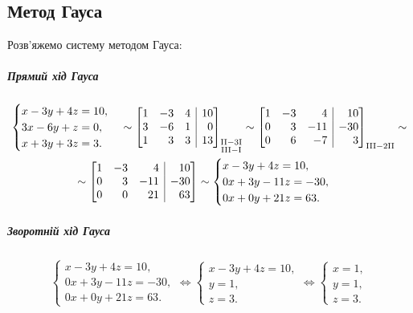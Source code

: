 \subsection{Метод Гауса}
\solving
Розв'яжемо систему методом Гауса:
\subparagraph{Прямий хід Гауса}
\begin{gather}
	\begin{cases}
		x-3y+4z=10,\\
		3x-6y+z=0,\\
		x+3y+3z=3.
	\end{cases}\sim\left[\begin{array}{@{}rrr|r@{}}
	1&-3&4&10\\
	3&-6&1&0\\
	1&3&3&13
\end{array}\right]_{\substack{\mathrm{II-3I}\hfill\\\mathrm{III-I}}}\sim\left[\begin{array}{@{}rrr|r@{}}
1&-3&4&10\\
0&3&-11&-30\\
0&6&-7&3
\end{array}\right]_{\substack{\mathrm{III-2II}}}\sim\\
\sim\left[\begin{array}{@{}rrr|r@{}}
	1&-3&4&10\\
	0&3&-11&-30\\
	0&0&21&63
\end{array}\right]\sim\begin{cases}
x-3y+4z=10,\\
0x+3y-11z=-30,\\
0x+0y+21z=63.
\end{cases}
\end{gather}
\subparagraph{Зворотній хід Гауса}
\begin{gather}
	\begin{cases}
		x-3y+4z=10,\\
		0x+3y-11z=-30,\\
		0x+0y+21z=63.
	\end{cases}\Leftrightarrow\begin{cases}
	x-3y+4z=10,\\
	y=1,\\
	z=3.
\end{cases}\Leftrightarrow\begin{cases}
x=1,\\
y=1,\\
z=3.
\end{cases}
\end{gather}


